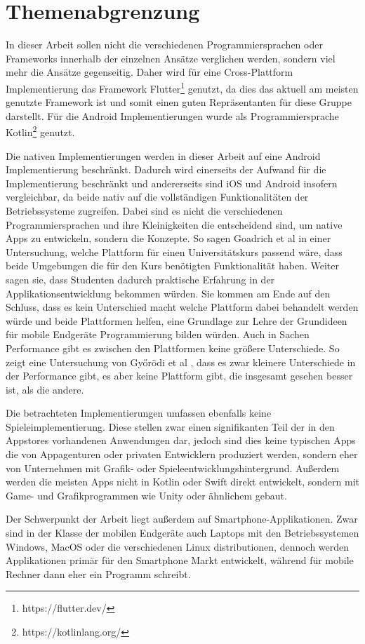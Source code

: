 \section{Themenabgrenzung}
In dieser Arbeit sollen nicht die verschiedenen Programmiersprachen oder Frameworks innerhalb der einzelnen Ansätze verglichen werden, sondern viel mehr die Ansätze gegenseitig. Daher wird für eine Cross-Plattform Implementierung das Framework Flutter\footnote{https://flutter.dev/} genutzt, da dies das aktuell am meisten genutzte Framework\cite{statist_CP_Framework} ist und somit einen guten Repräsentanten für diese Gruppe darstellt. Für die Android Implementierungen wurde als Programmiersprache Kotlin\footnote{https://kotlinlang.org/} genutzt. 

Die nativen Implementierungen werden in dieser Arbeit auf eine Android Implementierung beschränkt. 
Dadurch wird einerseits der Aufwand für die Implementierung beschränkt und andererseits sind iOS und Android insofern vergleichbar, da beide nativ auf die vollständigen Funktionalitäten der Betriebssysteme zugreifen.
Dabei sind es nicht die verschiedenen Programmiersprachen und ihre Kleinigkeiten die entscheidend sind, um native Apps zu entwickeln, sondern die Konzepte.
So sagen Goadrich et al \cite{iOSvsAndroid} in einer Untersuchung, welche Plattform für einen Universitätskurs passend wäre, dass beide Umgebungen die für den Kurs benötigten Funktionalität haben.
Weiter sagen sie, dass Studenten dadurch praktische Erfahrung in der Applikationsentwicklung bekommen würden. Sie kommen am Ende auf den Schluss, dass es kein Unterschied macht welche Plattform dabei behandelt werden würde und beide Plattformen helfen, eine Grundlage zur Lehre der Grundideen für mobile Endgeräte Programmierung bilden würden.
Auch in Sachen Performance gibt es zwischen den Plattformen keine größere Unterschiede. So zeigt eine Untersuchung von Győrödi et al \cite{Android_IOS_Performance_comparison}, dass es zwar kleinere Unterschiede in der Performance gibt, es aber keine Plattform gibt, die insgesamt gesehen besser ist, als die andere.

Die betrachteten Implementierungen umfassen ebenfalls keine Spieleimplementierung. Diese stellen zwar einen signifikanten Teil der in den Appstores vorhandenen Anwendungen dar, jedoch sind dies keine typischen Apps die von Appagenturen oder privaten Entwicklern produziert werden, sondern eher von Unternehmen mit Grafik- oder Spieleentwicklungshintergrund. Außerdem werden die meisten Apps nicht in Kotlin oder Swift direkt entwickelt, sondern mit Game- und Grafikprogrammen wie Unity oder ähnlichem gebaut. 



Der Schwerpunkt der Arbeit liegt außerdem auf Smartphone-Applikationen. Zwar sind in der Klasse der mobilen Endgeräte auch Laptops mit den Betriebssystemen Windows, MacOS oder die verschiedenen Linux distributionen, dennoch werden Applikationen primär für den Smartphone Markt entwickelt, während für mobile Rechner dann eher ein Programm schreibt.
